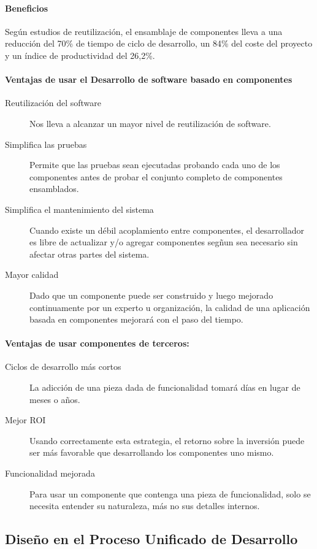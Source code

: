 \paragraph{Beneficios}
Según estudios de reutilización, el ensamblaje de componentes lleva a una reducción del 70\% de tiempo de ciclo de desarrollo, un 84\% del coste del proyecto y un índice de productividad del 26,2\%.
\paragraph{Ventajas de usar el Desarrollo de software basado en componentes}
\begin{description}
\item[Reutilización del software] Nos lleva a alcanzar un mayor nivel de reutilización de software.
\item[Simplifica las pruebas] Permite que las pruebas sean ejecutadas probando cada uno de los componentes antes de probar el conjunto completo de componentes ensamblados.
\item[Simplifica el mantenimiento del sistema] Cuando existe un débil acoplamiento entre componentes, el desarrollador es libre de actualizar y/o agregar componentes segñun sea necesario sin afectar otras partes del sistema.
\item[Mayor calidad] Dado que un componente puede ser construido y luego mejorado continuamente por un experto u organización, la calidad de una aplicación basada en componentes mejorará con el paso del tiempo.
\end{description}

\paragraph{Ventajas de usar componentes de terceros:}
\begin{description}
\item[Ciclos de desarrollo más cortos] La adicción de una pieza dada de funcionalidad tomará días en lugar de meses o años.
\item[Mejor ROI] Usando correctamente esta estrategia, el retorno sobre la inversión puede ser más favorable que desarrollando los componentes uno mismo.
\item[Funcionalidad mejorada] Para usar un componente que contenga una pieza de funcionalidad, solo se necesita entender su naturaleza, más no sus detalles internos.
\end{description}

\subsection{Diseño en el Proceso Unificado de Desarrollo}
